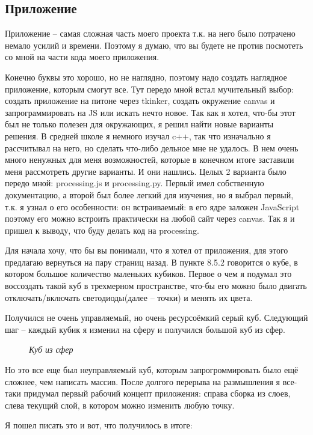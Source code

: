 \documentclass[a4paper, 12pt]{article}
\newcommand{\image}[3]{
	\begin{figure}[ht]
		\center{\texttt{[image: img/\#1]} }
		\caption{\textit{#3}}\end{figure}
}
\begin{document}
\newpage
\subsection{Приложение}

Приложение -- самая сложная часть моего проекта т.к. на него было потрачено
немало усилий и времени. Поэтому я думаю, что вы будете не против посмотеть со
мной на части кода моего приложения.

Конечно буквы это хорошо, но не наглядно, поэтому надо создать наглядное
приложение, которым смогут все. Тут передо мной встал мучительный выбор:
создать приложение на питоне через tkinker, создать окружение canvas и
запрограммировать на JS или искать нечто новое. Так как я хотел, что-бы этот
был не только полезен для окружающих, я решил найти новые варианты решения.
В средней школе я немного изучал c++, так что изначально я рассчитывал на него,
но сделать что-либо дельное мне не удалось. В нем очень много ненужных для
меня возможностей, которые в конечном итоге заставили меня рассмотреть другие
варианты. И они нашлись. Целых 2 варианта было передо мной: processing.js и
processing.py. Первый имел собственную документацию, а второй был более легкий
для изучения, но я выбрал первый, т.к. я узнал о его особенности: он
встраиваемый: в его ядре заложен JavaScript поэтому его можно встроить
практически на любой сайт через canvas. Так я и пришел к выводу, что буду
делать код на processing.

Для начала хочу, что бы вы понимали, что я хотел от приложения, для этого
предлагаю вернуться на пару страниц назад. В пункте 8.5.2 говорится о кубе,
в котором большое количество маленьких кубиков. Первое о чем я подумал это
воссоздать такой куб в трехмерном пространстве, что-бы его можно было двигать
отключать/включать светодиоды(далее -- точки) и менять их цвета.

Получился не очень управляемый, но очень ресурсоёмкий серый куб. Следующий шаг
-- каждый кубик я изменил на сферу и получился большой куб из сфер.

\image{Куб из сфер.png}{200}{Куб из сфер}

Но это все еще был неуправляемый куб, которым запрогроммировать было ещё
сложнее, чем написать массив.
\newpage
После долгого перерыва на размышления я все-таки придумал первый рабочий
концепт приложения: справа сборка из слоев, слева текущий слой, в котором
можно изменить любую точку.

Я пошел писать это и вот, что получилось в итоге:
\end{document}
